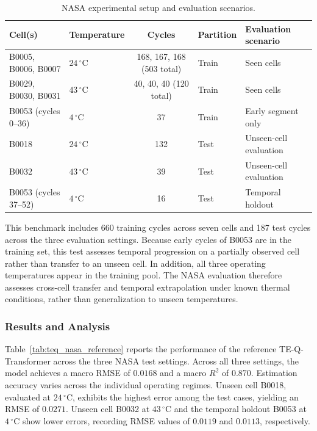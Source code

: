 \documentclass[a4paper,fleqn]{cas-sc}
\begin{document}
\begin{table}[t]
\centering
\small
\caption{NASA experimental setup and evaluation scenarios.}\label{tab:exp_split}
\begin{tabular}{@{}llcll@{}}
\toprule
Cell(s) & Temperature & Cycles & Partition & Evaluation scenario \\
\midrule
B0005, B0006, B0007 & $24\,^\circ\mathrm{C}$ & 168, 167, 168 (503 total) & Train & Seen cells \\
B0029, B0030, B0031 & $43\,^\circ\mathrm{C}$ & 40, 40, 40 (120 total) & Train & Seen cells \\
B0053 (cycles 0--36) & $4\,^\circ\mathrm{C}$ & 37 & Train & Early segment only \\
B0018 & $24\,^\circ\mathrm{C}$ & 132 & Test & Unseen-cell evaluation \\
B0032 & $43\,^\circ\mathrm{C}$ & 39 & Test & Unseen-cell evaluation \\
B0053 (cycles 37--52) & $4\,^\circ\mathrm{C}$ & 16 & Test & Temporal holdout \\
\bottomrule
\end{tabular}
\end{table}

This benchmark includes 660 training cycles across seven cells and 187 test cycles across the three evaluation settings. Because early cycles of B0053 are in the training set, this test assesses temporal progression on a partially observed cell rather than transfer to an unseen cell. In addition, all three operating temperatures appear in the training pool. The NASA evaluation therefore assesses cross-cell transfer and temporal extrapolation under known thermal conditions, rather than generalization to unseen temperatures.

\subsubsection{Results and Analysis}\label{sec:nasa_results}

Table~\ref{tab:teq_nasa_reference} reports the performance of the reference TE-Q-Transformer across the three NASA test settings. Across all three settings, the model achieves a macro RMSE of $0.0168$ and a macro $R^2$ of $0.870$. Estimation accuracy varies across the individual operating regimes. Unseen cell B0018, evaluated at $24\,^\circ\mathrm{C}$, exhibits the highest error among the test cases, yielding an RMSE of $0.0271$. Unseen cell B0032 at $43\,^\circ\mathrm{C}$ and the temporal holdout B0053 at $4\,^\circ\mathrm{C}$ show lower errors, recording RMSE values of $0.0119$ and $0.0113$, respectively.
\end{document}
